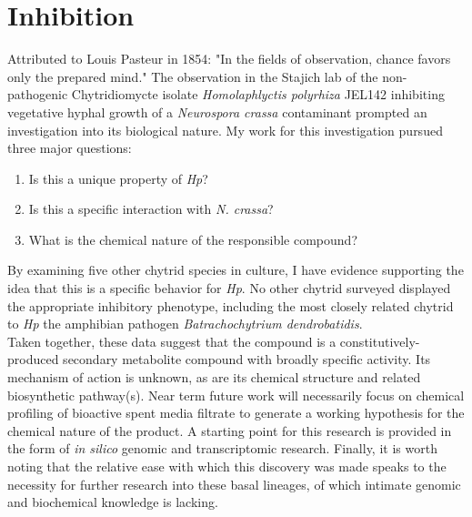 \section{Inhibition}
Attributed to Louis Pasteur in 1854: "In the fields of observation, chance favors only the prepared mind." The observation in the Stajich lab of the non-pathogenic Chytridiomycte isolate \textit{Homolaphlyctis polyrhiza} JEL142 inhibiting vegetative hyphal growth of a \textit{Neurospora crassa} contaminant prompted an investigation into its biological nature. My work for this investigation pursued three major questions:\\
\begin{enumerate}
  \item Is this a unique property of \textit{Hp}?
  \item Is this a specific interaction with \textit{N. crassa}?
  \item What is the chemical nature of the responsible compound?
\end{enumerate}
\indent By examining five other chytrid species in culture, I have evidence supporting the idea that this is a specific behavior for \textit{Hp}. No other chytrid surveyed displayed the appropriate inhibitory phenotype, including the most closely related chytrid to \textit{Hp} the amphibian pathogen \textit{Batrachochytrium dendrobatidis}.\\
\indent Taken together, these data suggest that the compound is a constitutively-produced secondary metabolite compound with broadly specific activity. Its mechanism of action is unknown, as are its chemical structure and related biosynthetic pathway(s). Near term future work will necessarily focus on chemical profiling of bioactive spent media filtrate to generate a working hypothesis for the chemical nature of the product. A starting point for this research is provided in the form of \textit{in silico} genomic and transcriptomic research. Finally, it is worth noting that the relative ease with which this discovery was made speaks to the necessity for further research into these basal lineages, of which intimate genomic and biochemical knowledge is lacking.\\
